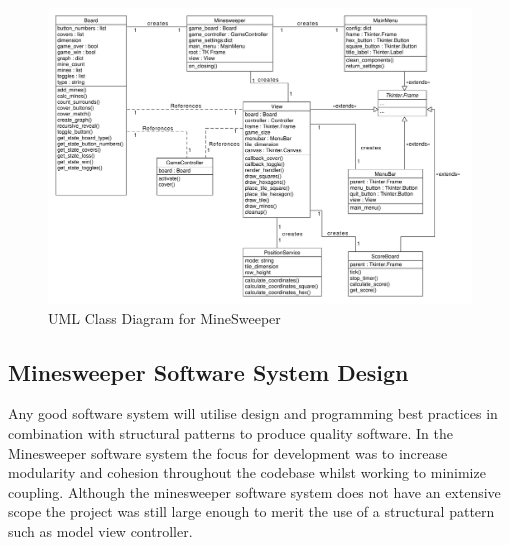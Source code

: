 \documentclass[12pt, a4]{report}
\begin{document}
\begin{figure}[!h]
	\centering
	\includegraphics[scale=0.50]{class}
	\caption{UML Class Diagram for MineSweeper}
	\label{Class}
\end{figure}

%
%
\clearpage
\label{SystemDesign}
\subsection{Minesweeper Software System Design}
\par Any good software system will utilise design and programming best practices in combination with structural patterns to produce quality software. In the Minesweeper software system the focus for development was to increase modularity and cohesion throughout the codebase whilst working to minimize coupling. Although the minesweeper software system does not have an extensive scope the project was still large enough to merit the use of a structural pattern such as model view controller.
\end{document}
